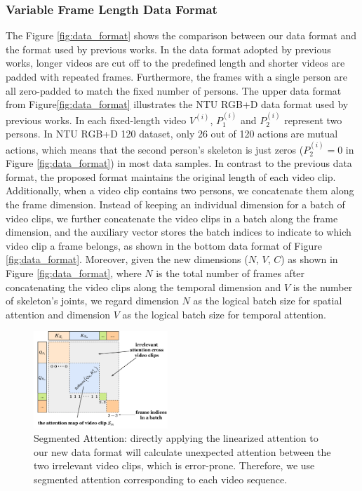 \documentclass[letterpaper]{article} %
\begin{document}
\subsubsection{Variable Frame Length Data Format} 
The Figure \ref{fig:data_format} shows the comparison between our data format and the format used by previous works. In the data format adopted by previous works, longer videos are cut off to the predefined length and shorter videos are padded with repeated frames. Furthermore, the frames with a single person are all zero-padded to match the fixed number of persons. The upper data format from Figure\ref{fig:data_format} illustrates the NTU RGB+D data format used by previous works. In each fixed-length video $V^{(i)}$, $P_1^{(i)}$ and $P_2^{(i)}$ represent two persons. In NTU RGB+D 120 dataset, only 26 out of 120 actions are mutual actions, which means that the second person's skeleton is just zeros ($P_2^{(i)} = 0$ in Figure \ref{fig:data_format}) in most data samples. In contrast to the previous data format, the proposed format maintains the original length of each video clip. Additionally, when a video clip contains two persons, we concatenate them along the frame dimension. Instead of keeping an individual dimension for a batch of video clips, we further concatenate the video clips in a batch along the frame dimension, and the auxiliary vector stores the batch indices to indicate to which video clip a frame belongs, as shown in the bottom data format of Figure \ref{fig:data_format}. Moreover, given the new dimensions ($N$, $V$, $C$) as shown in Figure \ref{fig:data_format}, where $N$ is the total number of frames after concatenating the video clips along the temporal dimension and $V$ is the number of skeleton's joints, we regard dimension $N$ as the logical batch size for spatial attention and dimension $V$ as the logical batch size for temporal attention.

\begin{figure}[ht]
    \centering
    \includegraphics[width=0.45\textwidth]{sgm_attn.pdf}
    \caption{Segmented Attention: directly applying the linearized attention to our new data format will calculate unexpected attention between the two irrelevant video clips, which is error-prone. Therefore, we use segmented attention corresponding to each video sequence.}
    \label{fig:sgm_attn}
\end{figure}
\end{document}
